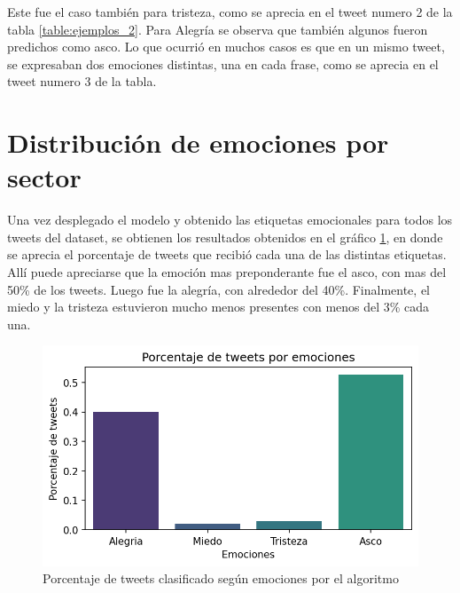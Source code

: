 Este fue el caso también para tristeza, como se aprecia en el tweet numero 2 de la tabla \ref{table:ejemplos_2}. Para Alegría se observa que también algunos fueron predichos como asco. Lo que ocurrió en muchos casos es que en un mismo tweet, se expresaban dos emociones distintas, una en cada frase, como se aprecia en el tweet numero 3 de la tabla.







\section{Distribución de emociones por sector}

Una vez desplegado el modelo y obtenido las etiquetas emocionales para todos los tweets del dataset, se obtienen los resultados obtenidos en el gráfico \ref{figure:tweets_total}, en donde se aprecia el porcentaje de tweets que recibió cada una de las distintas etiquetas. Allí puede apreciarse que la emoción mas preponderante fue el asco, con mas del 50\% de los tweets. Luego fue la alegría, con alrededor del  40\%. Finalmente, el miedo y la tristeza estuvieron mucho menos presentes con menos del 3\% cada una. 



\begin{figure}[t]
	\centering
	\includegraphics{Images & Logos/Results/Cantidad_de_tweets__por_emocion.png} 
	\caption{Porcentaje de tweets clasificado según emociones por el algoritmo}
	\label{figure:tweets_total}
\end{figure}



